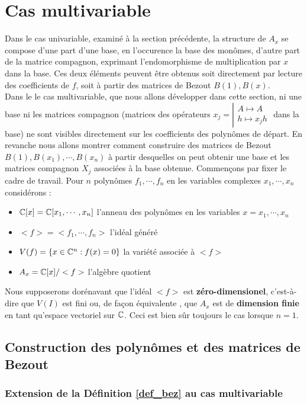 \documentclass{standalone}
\begin{document}
\section{Cas multivariable}
\label{multivariable}

Dans le cas univariable, examiné à la section précédente, la structure de $A_x$ se compose d'une part d'une base, en l'occurence la base des monômes, d'autre part de la matrice compagnon, exprimant l'endomorphisme de multiplication par $x$ dans la base. Ces deux éléments peuvent être obtenus soit directement par lecture des coefficients de $f$, soit à partir des matrices de Bezout $B(1), B(x)$. \\
Dans le le cas multivariable, que nous allons développer dans cette section, ni une base ni les matrices compagnon
(matrices des opérateurs
$x_j = \left\vert
\begin{array}{c}
A \mapsto A \\
h \mapsto x_jh
\end{array}
\right.$ dans la base) ne sont visibles directement sur les coefficients des polynômes de départ. En revanche nous allons montrer comment construire des matrices de Bezout $B(1), B(x_1), \cdots, B(x_n)$ à partir desquelles on peut obtenir une base et les matrices compagnon $X_j$ associées à la base obtenue. Commençons par fixer le cadre de travail.
Pour $n$ polynômes $f_1,\cdots, f_n$ en les variables complexes $x_1,\cdots, x_n$ considérons :
\begin{itemize}
\item $\mathbb{C}[x] = \mathbb{C}[x_1,\cdots, x_n]$ l'anneau des polynômes en les variables $x = x_1,\cdots, x_n$
\item $<f> = <f_1,\cdots, f_n>$ l'idéal généré
\item $V(f) = \{x \in \mathbb{C}^n : f(x) = 0\}$ la variété associée à $<f>$
\item $A_x = \mathbb{C}[x]/<f>$ l'algèbre quotient
\end{itemize}
Nous supposerons dorénavant que l'idéal $<f>$ est {\bf zéro-dimensionel}, c'est-à-dire que $V(I)$ est fini ou, de façon équivalente \cite[p.~234]{clo}, que $A_x$ est de {\bf dimension finie} en tant qu'espace vectoriel sur $\mathbb{C}$. Ceci est bien sûr toujours le cas lorsque $n = 1$.

\subsection{Construction des polynômes et des matrices de Bezout}

\subsubsection{Extension de la Définition \ref{def_bez} au cas multivariable}
\label{def_bez_multi}
\end{document}
